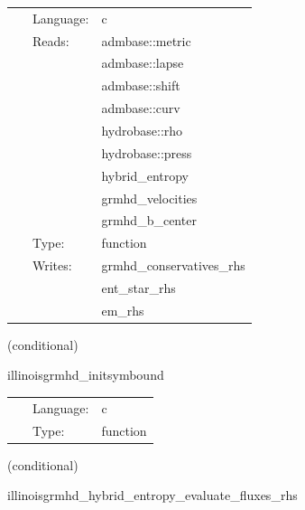  \begin{tabular*}{160mm}{cll} 
~ & Language:  & c \\ 
~ & Reads:  & admbase::metric \\ 
~& ~ &admbase::lapse\\ 
~& ~ &admbase::shift\\ 
~& ~ &admbase::curv\\ 
~& ~ &hydrobase::rho\\ 
~& ~ &hydrobase::press\\ 
~& ~ &hybrid\_entropy\\ 
~& ~ &grmhd\_velocities\\ 
~& ~ &grmhd\_b\_center\\ 
~ & Type:  & function \\ 
~ & Writes:  & grmhd\_conservatives\_rhs \\ 
~& ~ &ent\_star\_rhs\\ 
~& ~ &em\_rhs\\ 
\end{tabular*} 


\vspace{5mm}

   (conditional) 

\hspace{5mm} illinoisgrmhd\_initsymbound 

\hspace{5mm}{\it schedule symmetries } 


\hspace{5mm}

 \begin{tabular*}{160mm}{cll} 
~ & Language:  & c \\ 
~ & Type:  & function \\ 
\end{tabular*} 


\vspace{5mm}

   (conditional) 

\hspace{5mm} illinoisgrmhd\_hybrid\_entropy\_evaluate\_fluxes\_rhs 

\hspace{5mm}{\it entropy+hybrid version of illinoisgrmhd\_evaluate\_fluxes\_rhs } 


\hspace{5mm}

